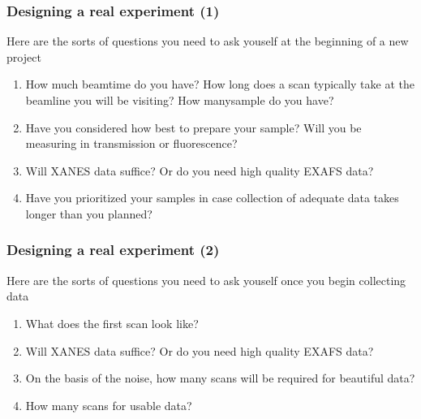 \documentclass[10pt, xcolor=x11names, compress]{beamer}
\begin{document}
\begin{frame}
  \frametitle{Designing a real experiment (1)}
  \begin{block}{Here are the sorts of questions you need to ask
      youself at the beginning of a new project}
    \begin{enumerate}
    \item How much beamtime do you have?  How long does a scan
      typically take at the beamline you will be visiting?  How
      manysample do you have?
    \item Have you considered how best to prepare your sample?  Will
      you be measuring in transmission or fluorescence?
    \item Will XANES data suffice?  Or do you need high quality EXAFS
      data?
    \item Have you prioritized your samples in case collection of
      adequate data takes longer than you planned?
    \end{enumerate}
  \end{block}
\end{frame}

\begin{frame}
  \frametitle{Designing a real experiment (2)}
  \begin{exampleblock}{Here are the sorts of questions you need to ask
      youself once you begin collecting data}
    \begin{enumerate}
    \item What does the first scan look like?
    \item Will XANES data suffice?  Or do you need high quality EXAFS
      data?
    \item On the basis of the noise, how many scans will be required
      for beautiful data?
    \item How many scans for usable data?
    \end{enumerate}
  \end{exampleblock}
\end{frame}
\end{document}
